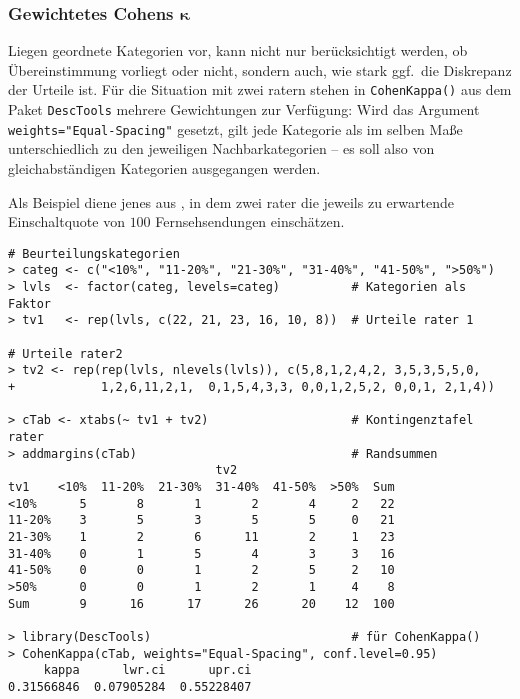 \subsubsection[Gewichtetes Cohens \texorpdfstring{$\kappa$}{kappa}]{Gewichtetes Cohens $\bm{\kappa}$}

Liegen geordnete Kategorien vor, kann nicht nur berücksichtigt werden, ob Übereinstimmung vorliegt oder nicht, sondern auch, wie stark ggf.\ die Diskrepanz der Urteile ist. Für die Situation mit zwei ratern stehen in \lstinline!CohenKappa()! aus dem Paket \lstinline!DescTools! mehrere Gewichtungen zur Verfügung: Wird das Argument \lstinline!weights="Equal-Spacing"! gesetzt, gilt jede Kategorie als im selben Maße unterschiedlich zu den jeweiligen Nachbarkategorien -- es soll also von gleichabständigen Kategorien ausgegangen werden.

Als Beispiel diene jenes aus , in dem zwei rater die jeweils zu erwartende Einschaltquote von $100$ Fernsehsendungen einschätzen.
\begin{lstlisting}
# Beurteilungskategorien
> categ <- c("<10%", "11-20%", "21-30%", "31-40%", "41-50%", ">50%")
> lvls  <- factor(categ, levels=categ)          # Kategorien als Faktor
> tv1   <- rep(lvls, c(22, 21, 23, 16, 10, 8))  # Urteile rater 1

# Urteile rater2
> tv2 <- rep(rep(lvls, nlevels(lvls)), c(5,8,1,2,4,2, 3,5,3,5,5,0,
+            1,2,6,11,2,1,  0,1,5,4,3,3, 0,0,1,2,5,2, 0,0,1, 2,1,4))

> cTab <- xtabs(~ tv1 + tv2)                    # Kontingenztafel rater
> addmargins(cTab)                              # Randsummen
                             tv2
tv1    <10%  11-20%  21-30%  31-40%  41-50%  >50%  Sum
<10%      5       8       1       2       4     2   22
11-20%    3       5       3       5       5     0   21
21-30%    1       2       6      11       2     1   23
31-40%    0       1       5       4       3     3   16
41-50%    0       0       1       2       5     2   10
>50%      0       0       1       2       1     4    8
Sum       9      16      17      26      20    12  100

> library(DescTools)                            # für CohenKappa()
> CohenKappa(cTab, weights="Equal-Spacing", conf.level=0.95)
     kappa      lwr.ci      upr.ci
0.31566846  0.07905284  0.55228407
\end{lstlisting}

